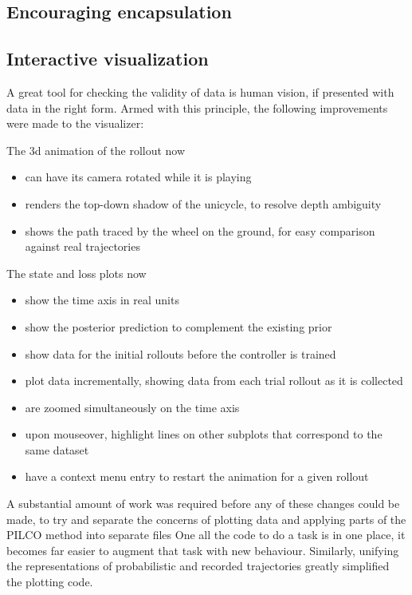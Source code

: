 \documentclass[main.tex]{subfiles}
\begin{document}
\subsection{Encouraging encapsulation}

\subsection{Interactive visualization}

A great tool for checking the validity of data is human vision, if presented with data in the right form.
Armed with this principle, the following improvements were made to the visualizer:
\begin{multicols}{2}
	\raggedcolumns
	\noindent
	The 3d animation of the rollout now
	\begin{itemize}[nosep]
		\item can have its camera rotated while it is playing
		\item renders the top-down shadow of the unicycle, to resolve depth ambiguity
		\item shows the path traced by the wheel on the ground, for easy comparison against real trajectories
	\end{itemize}
	\columnbreak
	\noindent
	The state and loss plots now
	\begin{itemize}[nosep]
		\item show the time axis in real units
		\item show the posterior prediction to complement the existing prior
		\item show data for the initial rollouts before the controller is trained
		\item plot data incrementally, showing data from each trial rollout as it is collected
		\item are zoomed simultaneously on the time axis
		\item upon mouseover, highlight lines on other subplots that correspond to the same dataset
		\item have a context menu entry to restart the animation for a given rollout
	\end{itemize}
\end{multicols}

A substantial amount of work was required before any of these changes could be made, to try and separate the concerns of plotting data and applying parts of the PILCO method into separate files
One all the code to do a task is in one place, it becomes far easier to augment that task with new behaviour.
Similarly, unifying the representations of probabilistic and recorded trajectories greatly simplified the plotting code.
\end{document}

